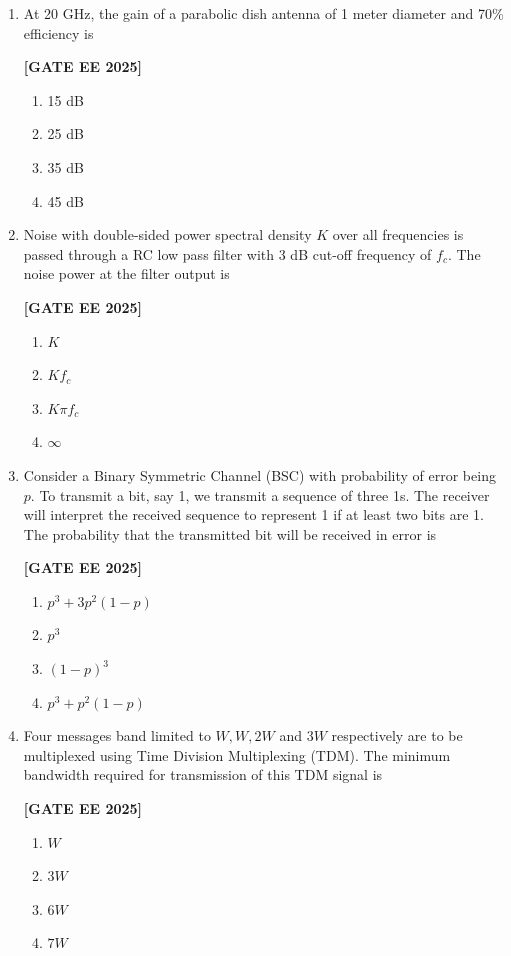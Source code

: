 \documentclass[12pt]{article}
\begin{document}
\begin{enumerate}[leftmargin=*, label=\textbf{Q.\arabic*:}]
\item At 20 GHz, the gain of a parabolic dish antenna of 1 meter diameter and 70\% efficiency is
 
\noindent \textbf{[GATE EE 2025]}
\begin{enumerate}
  \item 15 dB
  \item 25 dB
  \item 35 dB
  \item 45 dB
\end{enumerate}

\item Noise with double-sided power spectral density $K$ over all frequencies is passed through a RC low pass filter with 3 dB cut-off frequency of $f_c$. The noise power at the filter output is
 
\noindent \textbf{[GATE EE 2025]}
\begin{enumerate}
  \item $K$
  \item $K f_c$
  \item $K \pi f_c$
  \item $\infty$
\end{enumerate}

\item Consider a Binary Symmetric Channel (BSC) with probability of error being $p$. To transmit a bit, say 1, we transmit a sequence of three 1s. The receiver will interpret the received sequence to represent 1 if at least two bits are 1. The probability that the transmitted bit will be received in error is
 
\noindent \textbf{[GATE EE 2025]}
\begin{enumerate}
  \item $p^3 + 3p^2(1-p)$
  \item $p^3$
  \item $(1-p)^3$
  \item $p^3 + p^2(1-p)$
\end{enumerate}

\item Four messages band limited to $W, W, 2W$ and $3W$ respectively are to be multiplexed using Time Division Multiplexing (TDM). The minimum bandwidth required for transmission of this TDM signal is
 
\noindent \textbf{[GATE EE 2025]}
\begin{enumerate}
  \item $W$
  \item $3W$
  \item $6W$
  \item $7W$
\end{enumerate}


\end{enumerate}
\end{document}

